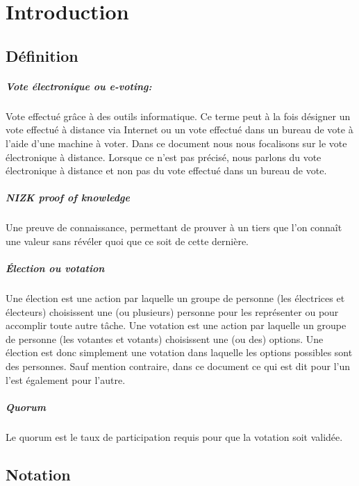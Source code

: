 \documentclass[../report]{subfiles}
\begin{document}
  \chapter{Introduction}

  \section{Définition}

  \paragraph{Vote électronique ou e-voting:}
  Vote effectué grâce à des outils informatique.
  Ce terme peut à la fois désigner un vote effectué à distance via Internet ou un vote effectué
  dans un bureau de vote à l'aide d'une machine à voter.
  Dans ce document nous nous focalisons sur le vote électronique à distance.
  Lorsque ce n'est pas précisé, nous parlons du vote électronique à distance et non pas du vote effectué dans un bureau de vote.

  \paragraph{NIZK proof of knowledge}
  Une preuve de connaissance, permettant de prouver à un tiers que l'on connaît une valeur sans révéler quoi que ce soit de cette dernière.

  \paragraph{Élection ou votation}
  Une élection est une action par laquelle un groupe de personne (les électrices et électeurs) choisissent une (ou plusieurs) personne
  pour les représenter ou pour accomplir toute autre tâche.
  Une votation est une action par laquelle un groupe de personne (les votantes et votants) choisissent une (ou des) options.
  Une élection est donc simplement une votation dans laquelle les options possibles sont des personnes.
  Sauf mention contraire, dans ce document ce qui est dit pour l'un l'est également pour l'autre.

  \paragraph{Quorum}
  Le quorum est le taux de participation requis pour que la votation soit validée.

  \section{Notation}
  
\end{document}
